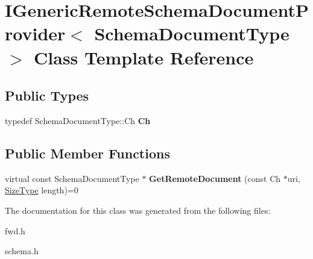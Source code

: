\hypertarget{a00142}{}\section{I\+Generic\+Remote\+Schema\+Document\+Provider$<$ Schema\+Document\+Type $>$ Class Template Reference}
\label{a00142}
\subsection*{Public Types}
\begin{DoxyCompactItemize}
\item 
typedef Schema\+Document\+Type\+::\+Ch {\bfseries Ch}\hypertarget{a00142_acfcd5492c3df8ff56cd2d84d36cc0ceb}{}\label{a00142_acfcd5492c3df8ff56cd2d84d36cc0ceb}

\end{DoxyCompactItemize}
\subsection*{Public Member Functions}
\begin{DoxyCompactItemize}
\item 
virtual const Schema\+Document\+Type $\ast$ {\bfseries Get\+Remote\+Document} (const Ch $\ast$uri, \hyperlink{a00677_a5ed6e6e67250fadbd041127e6386dcb5}{Size\+Type} length)=0\hypertarget{a00142_aad112a069dd57fe850fafd04cbb4777b}{}\label{a00142_aad112a069dd57fe850fafd04cbb4777b}

\end{DoxyCompactItemize}


The documentation for this class was generated from the following files\+:\begin{DoxyCompactItemize}
\item 
fwd.\+h\item 
schema.\+h\end{DoxyCompactItemize}
